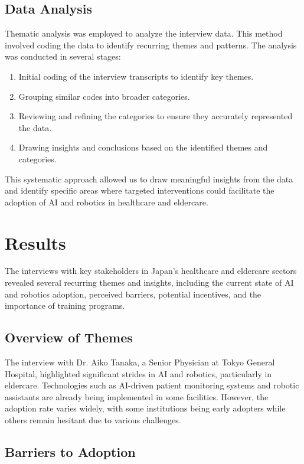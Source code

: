 \documentclass{article} %
\begin{document}
\subsection{Data Analysis}

Thematic analysis was employed to analyze the interview data. This method involved coding the data to identify recurring themes and patterns. The analysis was conducted in several stages:
\begin{enumerate}
    \item Initial coding of the interview transcripts to identify key themes.
    \item Grouping similar codes into broader categories.
    \item Reviewing and refining the categories to ensure they accurately represented the data.
    \item Drawing insights and conclusions based on the identified themes and categories.
\end{enumerate}
This systematic approach allowed us to draw meaningful insights from the data and identify specific areas where targeted interventions could facilitate the adoption of AI and robotics in healthcare and eldercare.


\section{Results}
\label{sec:results}

The interviews with key stakeholders in Japan's healthcare and eldercare sectors revealed several recurring themes and insights, including the current state of AI and robotics adoption, perceived barriers, potential incentives, and the importance of training programs.

\subsection{Overview of Themes}

The interview with Dr. Aiko Tanaka, a Senior Physician at Tokyo General Hospital, highlighted significant strides in AI and robotics, particularly in eldercare. Technologies such as AI-driven patient monitoring systems and robotic assistants are already being implemented in some facilities. However, the adoption rate varies widely, with some institutions being early adopters while others remain hesitant due to various challenges.

\subsection{Barriers to Adoption}
\end{document}
